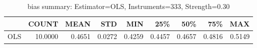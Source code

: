 \begin{table}[ht]
\centering
\caption{bias summary: Estimator=OLS, Instruments=333, Strength=0.30}
\begin{tabular}{lrrrrrrrr}
\toprule
 & COUNT & MEAN & STD & MIN & 25\% & 50\% & 75\% & MAX \\
\midrule
OLS & 10.0000 & 0.4651 & 0.0272 & 0.4259 & 0.4457 & 0.4657 & 0.4816 & 0.5149 \\
\bottomrule
\end{tabular}
\end{table}
